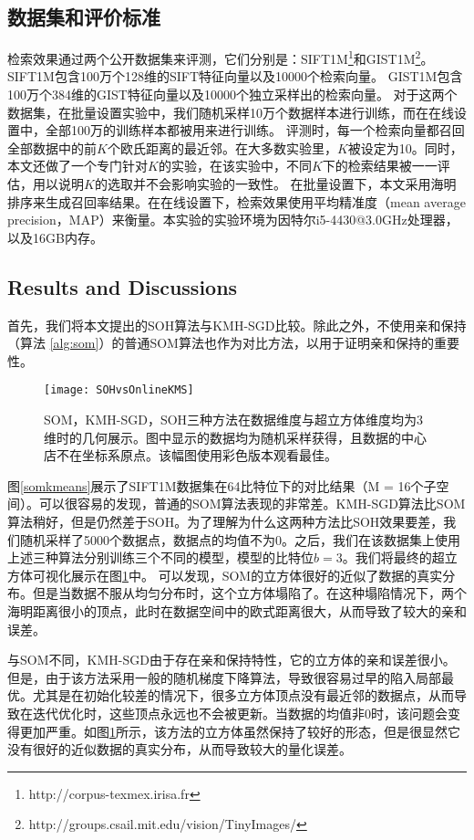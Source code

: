 \subsection{数据集和评价标准}
检索效果通过两个公开数据集来评测，它们分别是：SIFT1M\footnote{http://corpus-texmex.irisa.fr}和GIST1M\footnote{http://groups.csail.mit.edu/vision/TinyImages/}。
SIFT1M包含100万个128维的SIFT特征向量\cite{lowe2004distinctive}以及10000个检索向量。 GIST1M包含100万个384维的GIST特征向量\cite{oliva2001modeling}以及10000个独立采样出的检索向量。
对于这两个数据集，在批量设置实验中，我们随机采样10万个数据样本进行训练，而在在线设置中，全部100万的训练样本都被用来进行训练。
评测时，每一个检索向量都召回全部数据中的前$K$个欧氏距离的最近邻。在大多数实验里，$K$被设定为10。同时，本文还做了一个专门针对$K$的实验，在该实验中，不同$K$下的检索结果被一一评估，用以说明$K$的选取并不会影响实验的一致性。
在批量设置下，本文采用海明排序来生成召回率结果。在在线设置下，检索效果使用平均精准度（mean average precision，MAP）来衡量。本实验的实验环境为因特尔i5-4430@3.0GHz处理器，以及16GB内存。
\subsection{Results and Discussions}
首先，我们将本文提出的SOH算法与KMH-SGD比较。除此之外，不使用亲和保持 （算法 \ref{alg:som}）的普通SOM算法也作为对比方法，以用于证明亲和保持的重要性。
\begin{figure}[t]
	\begin{center}
		\texttt{[image: SOHvsOnlineKMS]}
		\caption{SOM，KMH-SGD，SOH三种方法在数据维度与超立方体维度均为3维时的几何展示。图中显示的数据均为随机采样获得，且数据的中心店不在坐标系原点。该幅图使用彩色版本观看最佳。}
		\label{somall_2}
	\end{center}
\end{figure}
图\ref{somkmeans}展示了SIFT1M数据集在64比特位下的对比结果（M = 16个子空间）。可以很容易的发现，普通的SOM算法表现的非常差。KMH-SGD算法比SOM算法稍好，但是仍然差于SOH。为了理解为什么这两种方法比SOH效果要差，我们随机采样了5000个数据点，数据点的均值不为0。之后，我们在该数据集上使用上述三种算法分别训练三个不同的模型，模型的比特位$b=3$。我们将最终的超立方体可视化展示在图\ref{somall_2}中。
可以发现，SOM的立方体很好的近似了数据的真实分布。但是当数据不服从均匀分布时，这个立方体塌陷了。在这种塌陷情况下，两个海明距离很小的顶点，此时在数据空间中的欧式距离很大，从而导致了较大的亲和误差。

与SOM不同，KMH-SGD由于存在亲和保持特性，它的立方体的亲和误差很小。但是，由于该方法采用一般的随机梯度下降算法，导致很容易过早的陷入局部最优。尤其是在初始化较差的情况下，很多立方体顶点没有最近邻的数据点，从而导致在迭代优化时，这些顶点永远也不会被更新。当数据的均值非0时，该问题会变得更加严重。如图\ref{somall_2}所示，该方法的立方体虽然保持了较好的形态，但是很显然它没有很好的近似数据的真实分布，从而导致较大的量化误差。

